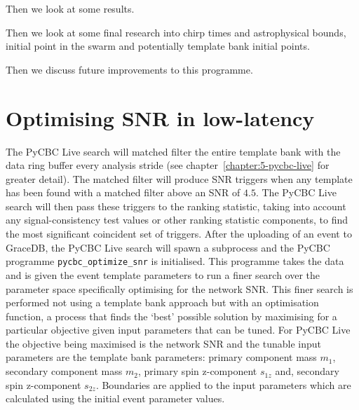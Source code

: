 Then we look at some results.

Then we look at some final research into chirp times and astrophysical bounds, initial point in the swarm and potentially template bank initial points.

Then we discuss future improvements to this programme.

\section{\label{7:sec:optimising_snr_in_low_latency}Optimising SNR in low-latency}

The PyCBC Live search will matched filter the entire template bank with the data ring buffer every analysis stride (see chapter~\ref{chapter:5-pycbc-live} for greater detail). The matched filter will produce SNR triggers when any template has been found with a matched filter above an SNR of $4.5$. The PyCBC Live search will then pass these triggers to the ranking statistic, taking into account any signal-consistency test values or other ranking statistic components, to find the most significant coincident set of triggers. After the uploading of an event to GraceDB, the PyCBC Live search will spawn a subprocess and the PyCBC programme \texttt{pycbc\_optimize\_snr} is initialised. This programme takes the \gwadj data and is given the event template parameters to run a finer search over the parameter space specifically optimising for the network SNR. This finer search is performed not using a template bank approach but with an optimisation function, a process that finds the `best' possible solution by maximising for a particular objective given input parameters that can be tuned. For PyCBC Live the objective being maximised is the network SNR and the tunable input parameters are the template bank parameters: primary component mass $m_{1}$, secondary component mass $m_{2}$, primary spin z-component $s_{1z}$ and, secondary spin z-component $s_{2z}$. Boundaries are applied to the input parameters which are calculated using the initial event parameter values.

